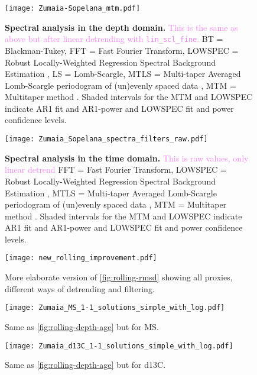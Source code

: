 \documentclass[draft]{agujournal2019}
\newcommand{\ijk}{\textcolor{violet}}
\begin{document}
\begin{figure}[htb]
  \centering \texttt{[image: Zumaia-Sopelana\_mtm.pdf]}
  \caption{\label{fig:spectral-depth}
    \textbf{Spectral analysis in the depth domain.}
    \ijk{This is the same as above but after linear detrending with \texttt{lin\_scl\_fine}.}
    BT = Blackman-Tukey,
    FFT = Fast Fourier Transform,
    LOWSPEC = Robust Locally-Weighted Regression Spectral Background Estimation \cite{Meyers2012},
    LS = Lomb-Scargle,
    MTLS = Multi-taper Averaged Lomb-Scargle periodogram of (un)evenly
spaced data \cite{Springford2020},
    MTM = Multitaper method \cite{Thomson1982}.
    Shaded intervals for the MTM and LOWSPEC indicate AR1 fit and AR1-power and LOWSPEC fit and power confidence levels.
  }
\end{figure}


\begin{figure}[htb]
  \centering \texttt{[image: Zumaia\_Sopelana\_spectra\_filters\_raw.pdf]}
  \caption{\label{fig:spectral-age-raw}
    \textbf{Spectral analysis in the time domain.}
    \ijk{This is raw values, only linear detrend}
    FFT = Fast Fourier Transform,
    LOWSPEC = Robust Locally-Weighted Regression Spectral Background Estimation \cite{Meyers2012},
    MTLS = Multi-taper Averaged Lomb-Scargle periodogram of (un)evenly
spaced data \cite{Springford2020},
    MTM = Multitaper method \cite{Thomson1982}.
    Shaded intervals for the MTM and LOWSPEC indicate AR1 fit and AR1-power and LOWSPEC fit and power confidence levels.
  }
\end{figure}


\begin{figure}[htb]
  \centering \texttt{[image: new\_rolling\_improvement.pdf]}
  \caption{\label{fig:rolling-rmsd-improvement}
    More elaborate version of \cref{fig:rolling-rmsd} showing all proxies, different ways of detrending and filtering.}
\end{figure}


\begin{figure}[htb]
  \centering
  \texttt{[image: Zumaia\_MS\_1-1\_solutions\_simple\_with\_log.pdf]}
  \caption{\label{fig:rolling-age-MS}
    Same as \cref{fig:rolling-depth-age} but for \gls{MS}.}
\end{figure}

\begin{figure}[htb]
  \centering
  \texttt{[image: Zumaia\_d13C\_1-1\_solutions\_simple\_with\_log.pdf]}
  \caption{\label{fig:rolling-age-d13C}
    Same as \cref{fig:rolling-depth-age} but for \gls{d13C}.}
\end{figure}
\end{document}
